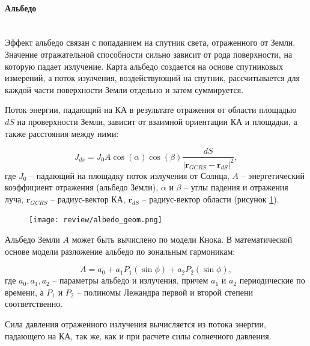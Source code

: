 \paragraph{Альбедо} \mbox{} \\

Эффект альбедо связан с попаданием на спутник света, отраженного от Земли.
Значение отражательной способности сильно зависит от рода поверхности, на которую падает излучение.
Карта альбедо создается на основе спутниковых измерений, а поток изулчения,
воздействующий на спутник, рассчитывается для каждой части поверхности Земли отдельно и затем суммируется.

Поток энергии, падающий на КА в результате отражения от области площадью $dS$ на 
проверхности Земли, зависит от взаимной
ориентации КА и площадки, а также расстояния между ними:

\begin{equation*}
    J_{ds} = J_0 A \cos(\alpha) \cos (\beta) 
    \frac{dS}{|\mathbf{r}_{GCRS} - \mathbf{r}_{dS}|^2},
\end{equation*}
где $J_0$ -- падающий на площадку поток излучения от Солнца, 
$A$ -- энергетический коэффициент отражения (альбедо Земли),
$\alpha$ и $\beta$ -- углы падения и отражения луча, 
$\mathbf{r}_{GCRS}$ -- радиус-вектор КА,
$\mathbf{r}_{dS}$ -- радиус-вектор области (рисунок \ref{fig:albedo_geom}).

\begin{figure}[h!]
    \centering
    \texttt{[image: review/albedo\_geom.png]}
    \label{fig:albedo_geom}
\end{figure}

Альбедо Земли $A$ может быть вычислено по модели Кнока. В математической основе модели
разложение альбедо по зональным гармоникам:

\begin{equation*}
    A = a_0 + a_1 P_1 (\sin\phi) + a_2 P_2 (\sin \phi),
\end{equation*}
где $a_0, a_1, a_2$ -- параметры альбедо и излучения, причем $a_1$ и $a_2$ периодические по
времени, а $P_1$ и $P_2$ -- полиномы Лежандра первой и второй степени соответственно.

Сила давления отраженного излучения вычисляется из потока энергии, падающего на КА,
так же, как и при расчете силы солнечного давления.


